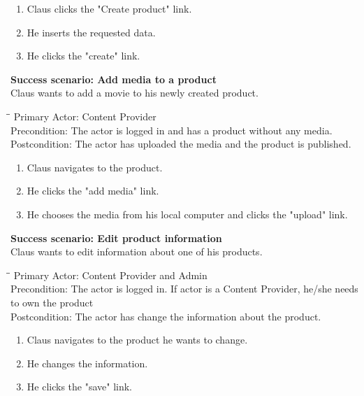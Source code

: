 \begin{enumerate} \setlength{\itemsep}{-1mm}
	\item Claus clicks the "Create product" link.
	\item He inserts the requested data.
	\item He clicks the "create" link.
\end{enumerate}
\vspace{3mm}
\textbf{Success scenario: Add media to a product} \\
Claus wants to add a movie to his newly created product.
\begin{tabbing}
\hspace{5mm}\=\hspace{26mm}\=\kill
\>Primary Actor:\> Content Provider\\
\>Precondition:\> The actor is logged in and has a product without any media.\\
\>Postcondition:\> The actor has uploaded the media and the product is published.
\end{tabbing}
\begin{enumerate} \setlength{\itemsep}{-1mm}
	\item Claus navigates to the product.
	\item He clicks the "add media" link.
	\item He chooses the media from his local computer and clicks the "upload" link.
\end{enumerate}
\vspace{3mm}
\textbf{Success scenario: Edit product information} \\
Claus wants to edit information about one of his products.
\begin{tabbing}
\hspace{5mm}\=\hspace{26mm}\=\kill
\>Primary Actor:\> Content Provider and Admin\\
\>Precondition:\> The actor is logged in. If actor is a Content Provider, he/she needs to own the product\\
\>Postcondition:\> The actor has change the information about the product.
\end{tabbing}
\begin{enumerate} \setlength{\itemsep}{-1mm}
	\item Claus navigates to the product he wants to change.
	\item He changes the information.
	\item He clicks the "save" link.
\end{enumerate}

